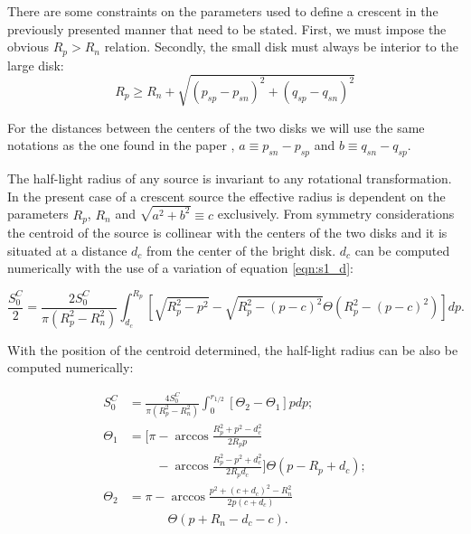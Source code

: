 There are some constraints on the parameters used to define a crescent in the previously presented manner that need to be stated. First, we must impose the obvious $R_p > R_n$ relation. Secondly, 
the small disk must always be interior to the large disk:
\begin{equation}
 R_p \ge R_n + \sqrt{\left(p_{sp} - p_{sn} \right)^2 + \left(q_{sp} - q_{sn} \right)^2}
\end{equation}

For the distances between the centers of the two disks we will use the same notations as the one found in the paper \citep{2013MNRAS.434..765K}, $a \equiv p_{sn} - p_{sp}$ and $b \equiv q_{sn} - q_{sp}$.

The half-light radius of any source is invariant to any rotational transformation. In the present case of a crescent source the effective radius is dependent on the parameters $R_p$, $R_n$ and $\sqrt{a^2+b^2}\equiv c $ exclusively. From symmetry considerations the centroid of the source is collinear with the centers of the two disks and it is situated at a distance $d_c$ from the center of the bright disk. $d_c$ can be computed numerically with the use of a variation of equation \ref{eqn:s1_d}:

\begin{equation}
\frac{S_0^C}{2} =  \frac{2 S_0^C}{\pi \left(R_p^2-R_n^2 \right)} \int_{d_c}^{R_p} \left[ \sqrt{R_p^2 - p^2} - \sqrt{R_p^2 - \left(p-c\right)^2} \Theta \left(R_p^2 - \left(p-c\right)^2 \right) \right] dp.
\end{equation}   

With the position of the centroid determined, the half-light radius can be also be computed numerically:
 
\begin{equation}
\begin{aligned}
S_0^C &=  \frac{4S_0^C}{\pi \left(R_p^2-R_n^2 \right)} \int_{0}^{r_{1/2}} \left[ \Theta_2  - \Theta_1  \right] p dp; \\
\Theta_1 &= \bigg[ \pi - \arccos \frac{R_p^2 + p^2 -d_c^2}{2 R_p p} \\
         & \phantom{= \bigg[ \pi} - \arccos \frac{R_p^2 - p^2 + d_c^2}{2 R_p d_c}
            \bigg] \Theta \left( p - R_p + d_c \right); \\
\Theta_2 &=  \pi - \arccos \frac{ p^2  + (c+d_c)^2 - R_n^2}
                                {2 p \left(c + d_c \right)} \\
         & \phantom{= \pi - } \Theta \left( p + R_n - d_c -c \right). 
\end{aligned}
\end{equation}

